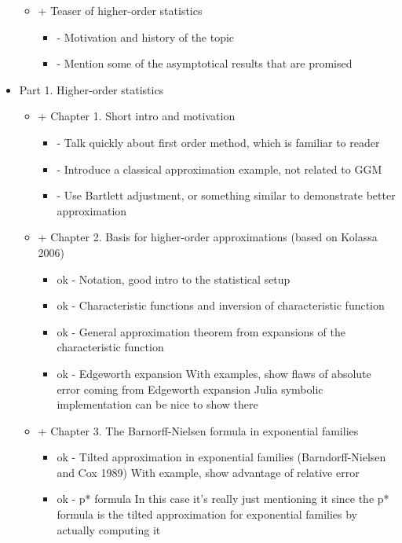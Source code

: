 \begin{itemize}
{\begin{itemize}
    \item{+ Teaser of higher-order statistics
    \begin{itemize}
        \item- Motivation and history of the topic
        \item- Mention some of the asymptotical results that are promised
    \end{itemize}}
\end{itemize}
}
\item{Part 1. Higher-order statistics
\begin{itemize}
    \item{\color{red} + Chapter 1. Short intro and motivation
    \begin{itemize}
        \item- Talk quickly about first order method, which is familiar to reader
        \item- Introduce a classical approximation example, not related to GGM
        \item- Use Bartlett adjustment, or something similar to demonstrate better approximation
    \end{itemize}}
    \item{\color{green} + Chapter 2. Basis for higher-order approximations (based on Kolassa 2006)
        \begin{itemize}
            \item ok - Notation, good intro to the statistical setup
            \item ok - Characteristic functions and inversion of characteristic function
            \item ok - General approximation theorem from expansions of the characteristic function 
            \item {ok - Edgeworth expansion
            With examples, show flaws of absolute error coming from Edgeworth expansion
            Julia symbolic implementation can be nice to show there}
        \end{itemize}}
        \item{\color{green} + Chapter 3. The Barnorff-Nielsen formula in exponential families
            \begin{itemize}
                \item {ok - Tilted approximation in exponential families (Barndorff-Nielsen and Cox 1989)
            With example, show advantage of relative error}
            \item {ok - p* formula
            In this case it's really just mentioning it since the p* formula is the tilted approximation for exponential families by actually computing it}

\end{itemize}}
\end{itemize}}
\end{itemize}
